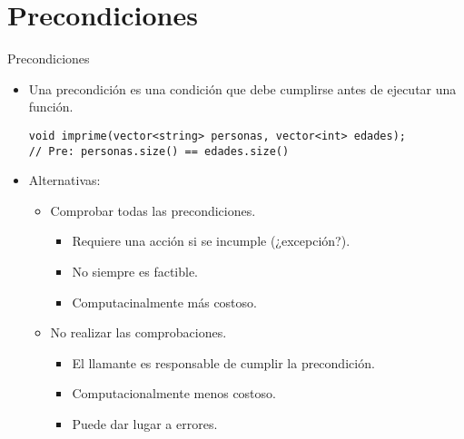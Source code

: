 \section{Precondiciones}

\begin{frame}[fragile]{Precondiciones}
\begin{itemize}
  \item Una \alert{precondición} es una condición que debe cumplirse
        antes de ejecutar una función.
\begin{lstlisting}
void imprime(vector<string> personas, vector<int> edades);
// Pre: personas.size() == edades.size()
\end{lstlisting}
  \item Alternativas:
    \begin{itemize}
      \item Comprobar todas las precondiciones.
        \begin{itemize}
          \item Requiere una acción si se incumple (¿excepción?).
          \item No siempre es factible.
          \item Computacinalmente más costoso.
        \end{itemize}
      \item No realizar las comprobaciones.
        \begin{itemize}
          \item El llamante es responsable de cumplir la precondición.
          \item Computacionalmente menos costoso.
          \item Puede dar lugar a errores.
        \end{itemize}
    \end{itemize}
\end{itemize}
\end{frame}


